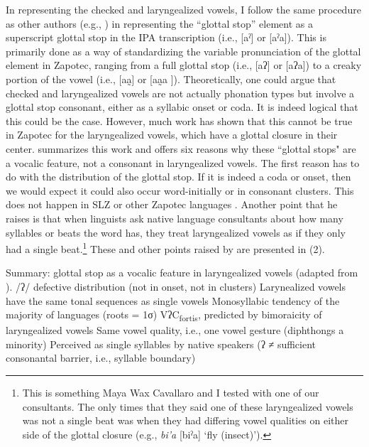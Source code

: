 \documentclass[12pt, letterpaper]{article}
\newcommand{\sub}[1]{\textsubscript{#1}}
\begin{document}
In representing the checked and laryngealized vowels, I follow the same procedure as other authors (e.g., \citet{avelinoAcousticElectroglottographicAnalyses2010, uchiharaToneRegistrogenesisQuiavini2016}) in representing the ``glottal stop'' element as a superscript glottal stop in the IPA transcription (i.e., [aˀ] or [aˀa]). This is primarily done as a way of standardizing the variable pronunciation of the glottal element in Zapotec, ranging from a full glottal stop (i.e., [aʔ] or [aʔa]) to a creaky portion of the vowel (i.e., [aa̰] or [aa̰a ]).  
Theoretically, one could argue that checked and laryngealized vowels are not actually phonation types but involve a glottal stop consonant, either as a syllabic onset or coda. It is indeed logical that this could be the case. However, much work has shown that this cannot be true in Zapotec for the laryngealized vowels, which have a glottal closure in their center. \citet{chavez-peonInteractionMetricalStructure2010} summarizes this work and offers six reasons why these ``glottal stops" are a vocalic feature, not a consonant in laryngealized vowels. The first reason has to do with the distribution of the glottal stop. If it is indeed a coda or onset, then we would expect it could also occur word-initially or in consonant clusters. This does not happen in SLZ or other Zapotec languages \citep{jaegerInitialConsonantClusters1982}. Another point that he raises is that when linguists ask native language consultants about how many syllables or beats the word has, they treat laryngealized vowels as if they only had a single beat.\footnote{This is something Maya Wax Cavallaro and I tested with one of our consultants. The only times that they said one of these laryngealized vowels was not a single beat was when they had differing vowel qualities on either side of the glottal closure (e.g., \textit{bi'a} [biˀa] `fly (insect)').} These and other points raised by \citeauthor{chavez-peonInteractionMetricalStructure2010} are presented in (2). 

\ea  Summary: glottal stop as a vocalic feature in laryngealized vowels (adapted from \cite{chavez-peonInteractionMetricalStructure2010}).
    \ea /ʔ/ defective distribution (not in onset, not in clusters)
    \ex Larynealized vowels have the same tonal sequences as single vowels
    \ex Monosyllabic tendency of the majority of languages (roots = 1σ)
    \ex *VʔC\sub{fortis}, predicted by bimoraicity of laryngealized vowels
    \ex Same vowel quality, i.e., one vowel gesture (diphthongs a minority)
    \ex Perceived as single syllables by native speakers (ʔ ≠ sufficient consonantal barrier, i.e., syllable boundary)
    \z 
\z 
\end{document}

